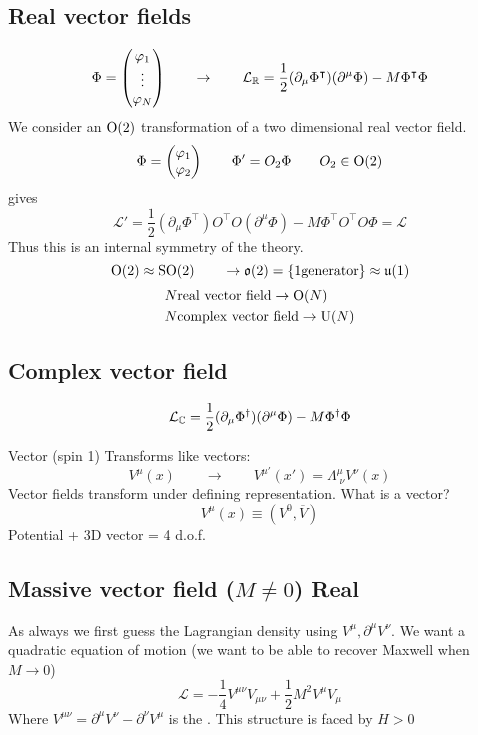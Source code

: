 \subsection{Real vector fields}
\[ \Phi = \begin{pmatrix}
\varphi_1 \\ \vdots \\ \varphi_N
\end{pmatrix} \qquad \to \qquad \mathcal{L}_{\mathbb{R}} = \frac{1}{2}(\partial_\mu\Phi^\intercal)(\partial^\mu\Phi) - M\Phi^\intercal\Phi \]
We consider an $\operatorname{O}(2)$ transformation of a two dimensional real vector field.
\[ \Phi = \begin{pmatrix}
\varphi_1 \\ \varphi_2
\end{pmatrix} \qquad \Phi' = O_2\Phi \qquad O_2 \in \operatorname{O}(2) \]
gives
\[ \mathcal{L}'= \frac{1}{2}(\partial_\mu\Phi^\intercal)O^\intercal O(\partial^\mu\Phi) - M\Phi^\intercal O^\intercal O\Phi = \mathcal{L} \]
Thus this is an internal symmetry of the theory.
\[ \operatorname{O}(2) \approx \operatorname{SO}(2) \qquad \to \operatorname{\mathfrak{o}}(2) = \{1 \text{generator}\} \approx \operatorname{\mathfrak{u}}(1) \]
\begin{align*}
&N \text{real vector field} \to \operatorname{O}(N) \\
&N \text{complex vector field} \to \operatorname{U}(N)
\end{align*}
\subsection{Complex vector field}
\[ \mathcal{L}_{\mathbb{C}} = \frac{1}{2}(\partial_\mu\Phi^\dagger)(\partial^\mu\Phi) - M\Phi^\dagger\Phi \]






Vector (spin 1)
Transforms like vectors:
\[ V^\mu(x) \qquad \to \qquad V^{\mu\prime}(x') = \Lambda^\mu_{\;\nu}V^\nu(x) \]
Vector fields transform under defining representation. What is a vector?
\[ V^\mu(x) \equiv (V^0,\overline{V}) \]
Potential + 3D vector = 4 d.o.f.

\subsection{Massive vector field ($M\neq0$) Real}
As always we first guess the Lagrangian density using $V^\mu, \partial^\mu V^\nu$.
We want a quadratic equation of motion (we want to be able to recover Maxwell when $M\to 0$)
\[ \mathcal{L} = - \frac{1}{4}V^{\mu\nu}V_{\mu\nu} + \frac{1}{2}M^2V^\mu V_\mu \]
Where $V^{\mu\nu} = \partial^\mu V^\nu - \partial^\nu V^\mu$ is the . This structure is faced by $H>0$
